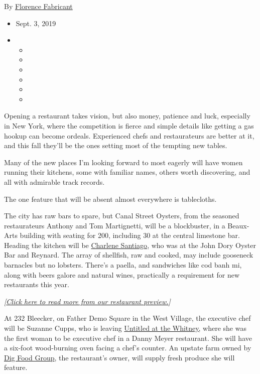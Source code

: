 By
\href{https://www.nytimes3xbfgragh.onion/by/florence-fabricant}{Florence
Fabricant}

\begin{itemize}
\item
  Sept. 3, 2019
\item
  \begin{itemize}
  \item
  \item
  \item
  \item
  \item
  \item
  \end{itemize}
\end{itemize}

Opening a restaurant takes vision, but also money, patience and luck,
especially in New York, where the competition is fierce and simple
details like getting a gas hookup can become ordeals. Experienced chefs
and restaurateurs are better at it, and this fall they'll be the ones
setting most of the tempting new tables.

Many of the new places I'm looking forward to most eagerly will have
women running their kitchens, some with familiar names, others worth
discovering, and all with admirable track records.

The one feature that will be absent almost everywhere is tablecloths.

The city has raw bars to spare, but Canal Street Oysters, from the
seasoned restaurateurs Anthony and Tom Martignetti, will be a
blockbuster, in a Beaux-Arts building with seating for 200, including 30
at the central limestone bar. Heading the kitchen will be
\href{https://www.reynardnyc.com/team-member/charlene-santiago/}{Charlene
Santiago}, who was at the John Dory Oyster Bar and Reynard. The array of
shellfish, raw and cooked, may include gooseneck barnacles but no
lobsters. There's a paella, and sandwiches like cod banh mi, along with
beers galore and natural wines, practically a requirement for new
restaurants this year.

\emph{{[}}\href{https://www.nytimes3xbfgragh.onion/2019/09/03/dining/fall-restaurant-preview-nyc.html}{\emph{Click
here to read more from our restaurant preview.}}\emph{{]}}

At 232 Bleecker, on Father Demo Square in the West Village, the
executive chef will be Suzanne Cupps, who is leaving
\href{https://www.nytimes3xbfgragh.onion/2015/08/05/dining/restaurant-review-untitled-at-the-whitney-in-the-meatpacking-district.html}{Untitled
at the Whitney,} where she was the first woman to be executive chef in a
Danny Meyer restaurant. She will have a six-foot wood-burning oven
facing a chef's counter. An upstate farm owned by
\href{https://www.diginn.com/}{Dig Food Group}, the restaurant's owner,
will supply fresh produce she will feature.

